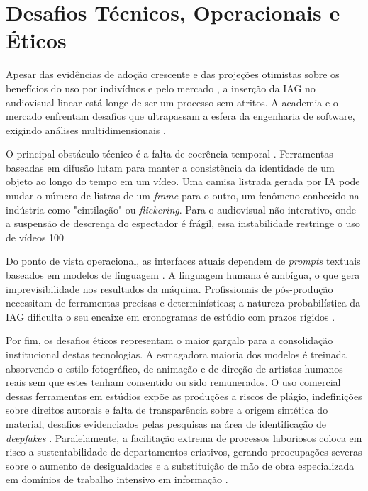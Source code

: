 \section{Desafios Técnicos, Operacionais e Éticos}

Apesar das evidências de adoção crescente e das projeções otimistas sobre os benefícios do uso por indivíduos e pelo mercado \citep{grandview2025generative, gambacorta2025exploring}, a inserção da IAG no audiovisual linear está longe de ser um processo sem atritos. A academia e o mercado enfrentam desafios que ultrapassam a esfera da engenharia de software, exigindo análises multidimensionais \citep{dwivedi2023chatgpt}.

O principal obstáculo técnico é a falta de coerência temporal \citep{gavran2025, orak2024}. Ferramentas baseadas em difusão lutam para manter a consistência da identidade de um objeto ao longo do tempo em um vídeo. Uma camisa listrada gerada por IA pode mudar o número de listras de um \textit{frame} para o outro, um fenômeno conhecido na indústria como "cintilação" ou \textit{flickering}. Para o audiovisual não interativo, onde a suspensão de descrença do espectador é frágil, essa instabilidade restringe o uso de vídeos 100%

Do ponto de vista operacional, as interfaces atuais dependem de \textit{prompts} textuais baseados em modelos de linguagem \citep{brown2020language}. A linguagem humana é ambígua, o que gera imprevisibilidade nos resultados da máquina. Profissionais de pós-produção necessitam de ferramentas precisas e determinísticas; a natureza probabilística da IAG dificulta o seu encaixe em cronogramas de estúdio com prazos rígidos \citep{franganillo2022}.

Por fim, os desafios éticos representam o maior gargalo para a consolidação institucional destas tecnologias. A esmagadora maioria dos modelos é treinada absorvendo o estilo fotográfico, de animação e de direção de artistas humanos reais sem que estes tenham consentido ou sido remunerados. O uso comercial dessas ferramentas em estúdios expõe as produções a riscos de plágio, indefinições sobre direitos autorais e falta de transparência sobre a origem sintética do material, desafios evidenciados pelas pesquisas na área de identificação de \textit{deepfakes} \citep{floridi2020gpt3, franganillo2022, tiwari2023}. Paralelamente, a facilitação extrema de processos laboriosos coloca em risco a sustentabilidade de departamentos criativos, gerando preocupações severas sobre o aumento de desigualdades e a substituição de mão de obra especializada em domínios de trabalho intensivo em informação \citep{capraro2024impact, dwivedi2023chatgpt}.

